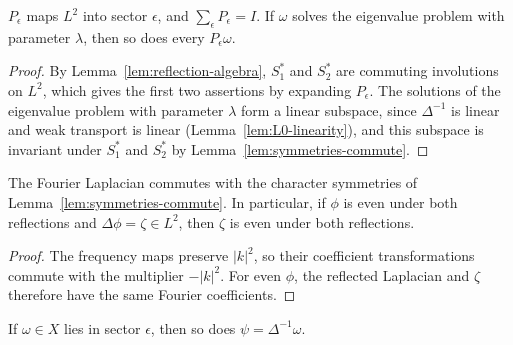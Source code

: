 \begin{lemma}
\label{lem:sector-reduction}
\leanok
$P_\epsilon$ maps $L^2$ into sector $\epsilon$, and
$\sum_\epsilon P_\epsilon=I$. If $\omega$ solves the eigenvalue problem with
parameter $\lambda$, then so does every $P_\epsilon\omega$.
\end{lemma}

\begin{proof}
\leanok
By Lemma~\ref{lem:reflection-algebra}, $S_1^*$ and $S_2^*$ are commuting
involutions on $L^2$, which gives the first two assertions by expanding
$P_\epsilon$. The solutions of the eigenvalue problem with parameter $\lambda$
form a linear subspace, since $\Delta^{-1}$ is linear and weak transport is
linear (Lemma~\ref{lem:L0-linearity}), and this subspace is invariant under
$S_1^*$ and $S_2^*$ by Lemma~\ref{lem:symmetries-commute}.
\end{proof}

\begin{lemma}
\label{lem:laplacian-symmetries}
\leanok
The Fourier Laplacian commutes with the character symmetries of
Lemma~\ref{lem:symmetries-commute}. In particular, if $\phi$ is even under
both reflections and $\Delta\phi=\zeta\in L^2$, then $\zeta$ is even under
both reflections.
\end{lemma}

\begin{proof}
\leanok
The frequency maps preserve $|k|^2$, so their coefficient transformations
commute with the multiplier $-|k|^2$. For even $\phi$, the reflected
Laplacian and $\zeta$ therefore have the same Fourier coefficients.
\end{proof}

\begin{lemma}
\label{lem:stream-sector}
\leanok
If $\omega\in X$ lies in sector $\epsilon$, then so does
$\psi=\Delta^{-1}\omega$.
\end{lemma}

